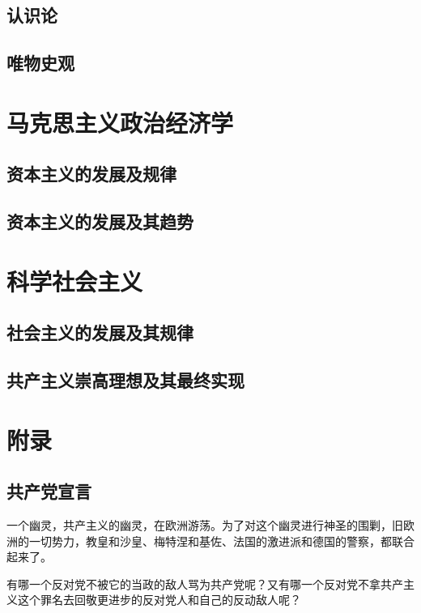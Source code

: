 \documentclass[10pt, UTF8]{book} %
\begin{document}
\newpage
\thispagestyle{empty}

\chapter{认识论}
\chapter{唯物史观}

\part{马克思主义政治经济学}

\chapter{资本主义的发展及规律}
\chapter{资本主义的发展及其趋势}

\part{科学社会主义}

\chapter{社会主义的发展及其规律}
\chapter{共产主义崇高理想及其最终实现}


\part{附录}
\setcounter{page}{0}

\chapter{共产党宣言}

\quad\quad
一个幽灵，共产主义的幽灵，在欧洲游荡。为了对这个幽灵进行神圣的围剿，旧欧洲的一切势力，教皇和沙皇、梅特涅和基佐、法国的激进派和德国的警察，都联合起来了。

有哪一个反对党不被它的当政的敌人骂为共产党呢？又有哪一个反对党不拿共产主义这个罪名去回敬更进步的反对党人和自己的反动敌人呢？
\end{document}
